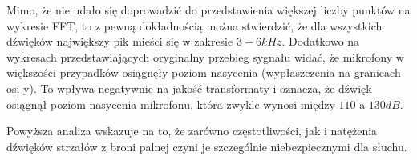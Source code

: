 Mimo, że nie udało się doprowadzić do przedstawienia większej liczby punktów na wykresie FFT, to z pewną dokładnością można stwierdzić, że dla wszystkich dźwięków największy pik mieści się w zakresie $ 3-6kHz $. Dodatkowo na wykresach przedstawiających oryginalny przebieg sygnału widać, że mikrofony w większości przypadków osiągnęły poziom nasycenia (wypłaszczenia na granicach osi y). To wpływa negatywnie na jakość transformaty i oznacza, że dźwięk osiągnął poziom nasycenia mikrofonu, która zwykle wynosi między $ 110 $ a $ 130 dB $. 

Powyższa analiza wskazuje na to, że zarówno częstotliwości, jak i natężenia dźwięków strzałów z broni palnej czyni je szczególnie niebezpiecznymi dla słuchu.
